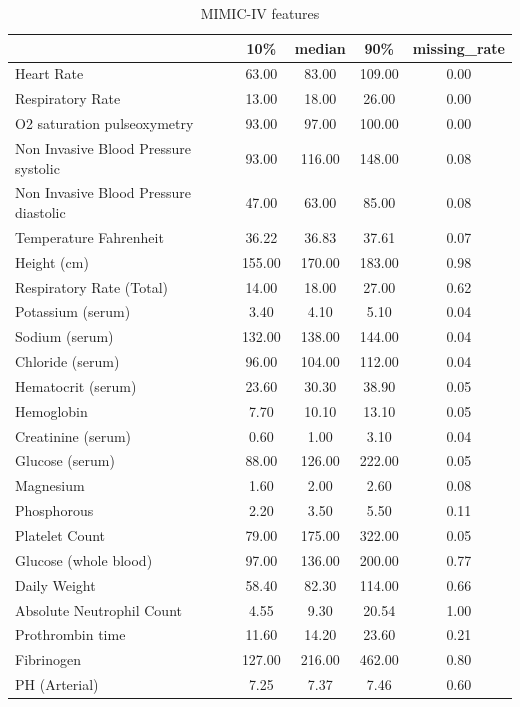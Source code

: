 \begin{table}[h!]
  \centering
  \caption{MIMIC-IV features}
  \label{app:table_mimic_features}
  \begin{tabular}{lcccc}
    \toprule
    & 10\% & median & 90\% & missing\_rate \\
    \midrule
    Heart Rate	& 63.00 & 83.00 & 109.00 & 0.00 \\
    Respiratory Rate	& 13.00 & 18.00 & 26.00 & 0.00 \\
    O2 saturation pulseoxymetry	& 93.00 & 97.00 & 100.00 & 0.00 \\
    Non Invasive Blood Pressure systolic	& 93.00 & 116.00 & 148.00 & 0.08 \\
    Non Invasive Blood Pressure diastolic	& 47.00 & 63.00 & 85.00 & 0.08 \\
    Temperature Fahrenheit	& 36.22 & 36.83 & 37.61 & 0.07 \\
    Height (cm)	& 155.00 & 170.00 & 183.00 & 0.98 \\
    Respiratory Rate (Total)	& 14.00 & 18.00 & 27.00 & 0.62 \\
    Potassium (serum)	& 3.40 & 4.10 & 5.10 & 0.04 \\
    Sodium (serum)	& 132.00 & 138.00 & 144.00 & 0.04 \\
    Chloride (serum)	& 96.00 & 104.00 & 112.00 & 0.04 \\
    Hematocrit (serum)	& 23.60 & 30.30 & 38.90 & 0.05 \\
    Hemoglobin	& 7.70 & 10.10 & 13.10 & 0.05 \\
    Creatinine (serum)	& 0.60 & 1.00 & 3.10 & 0.04 \\
    Glucose (serum)	& 88.00 & 126.00 & 222.00 & 0.05 \\
    Magnesium	& 1.60 & 2.00 & 2.60 & 0.08 \\
    Phosphorous	& 2.20 & 3.50 & 5.50 & 0.11 \\
    Platelet Count	& 79.00 & 175.00 & 322.00 & 0.05 \\
    Glucose (whole blood)	& 97.00 & 136.00 & 200.00 & 0.77 \\
    Daily Weight	& 58.40 & 82.30 & 114.00 & 0.66 \\
    Absolute Neutrophil Count	& 4.55 & 9.30 & 20.54 & 1.00 \\
    Prothrombin time	& 11.60 & 14.20 & 23.60 & 0.21 \\
    Fibrinogen	& 127.00 & 216.00 & 462.00 & 0.80 \\
   PH (Arterial) & 7.25 & 7.37 & 7.46 & 0.60 \\

\end{tabular}
\end{table}

